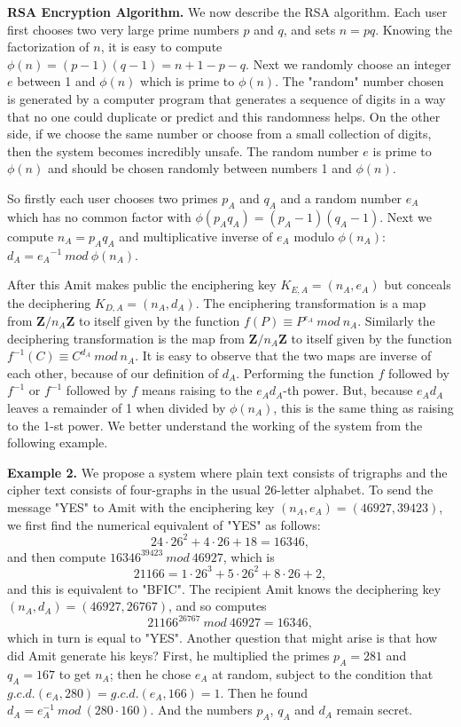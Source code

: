\documentclass[12pt]{article}
\begin{document}
\textbf{RSA Encryption Algorithm.} We now describe the RSA algorithm. Each user first chooses two very large prime numbers $p$ and $q$, and sets $n=pq$. Knowing the factorization of $n$, it is easy to compute $\phi(n)=(p-1)(q-1)=n+1-p-q$. Next we randomly choose an integer $e$ between 1 and $\phi(n)$ which is prime to $\phi(n)$. The "random" number chosen is generated by a computer program that generates a sequence of digits in a way that no one could duplicate or predict and this randomness helps. On the other side, if we choose the same number or choose from a small collection of digits, then the system becomes incredibly unsafe. The random number $e$ is prime to $\phi(n)$ and should be chosen randomly between numbers 1 and $\phi(n)$.

So firstly each user chooses two primes $p_A$ and $q_A$ and a random number $e_A$ which has no common factor with $\phi(p_A q_A)=(p_A-1)(q_A-1).$ Next we compute $n_A=p_A q_A$ and multiplicative inverse of $e_A$ modulo $\phi(n_A)$: $d_A={e_A}^{-1} \: mod \: \phi(n_A)$.

After this Amit makes public the enciphering key $K_{E,A}=(n_A,e_A)$ but conceals the deciphering $K_{D,A}=(n_A,d_A)$. The enciphering transformation is a map from \textbf{Z}$/n_A$\textbf{Z} to itself given by the function $f(P) \equiv P^{e_A} \: mod \: n_A$. Similarly the deciphering transformation is the map from \textbf{Z}$/n_A$\textbf{Z} to itself given by the function $f^{-1}(C) \equiv C^{d_A} \: mod \: n_A$. It is easy to observe that the two maps are inverse of each other, because of our definition of $d_A$. Performing the function $f$ followed by $f^{-1}$ or $f^{-1}$ followed by $f$ means raising to the $e_A d_A$-th power. But, because $e_A d_A$ leaves a remainder of 1 when divided by $\phi(n_A)$, this is the same thing as raising to the 1-st power. We better understand the working of the system from the following example.

\textbf{Example 2.} We propose a system where plain text consists of trigraphs and the cipher text consists of four-graphs in the usual 26-letter alphabet. To send the message "YES" to Amit with the enciphering key $(n_A,e_A)=(46927,39423)$, we first find the numerical equivalent of "YES" as follows:
$$24 \cdot 26^2 +4 \cdot 26+18=16346,$$ and then compute $16346^{39423} \: mod \: 46927$, which is
$$21166=1 \cdot 26^3 +5 \cdot 26^2 + 8 \cdot 26+2,$$
and this is equivalent to "BFIC". The recipient Amit knows the deciphering key $(n_A,d_A)=(46927,26767)$, and so computes
$$21166^{26767} \: mod \: 46927=16346,$$
which in turn is equal to "YES". Another question that might arise is that how did Amit generate his keys? First, he multiplied the primes $p_A=281$ and $q_A=167$ to get $n_A$; then he chose $e_A$ at random, subject to the condition that $g.c.d.(e_A,280)=g.c.d.(e_A,166)=1$. Then he found $d_A=e_A^{-1} \: mod \: (280 \cdot 160)$. And the numbers $p_A$, $q_A$ and $d_A$ remain secret.
\end{document}

